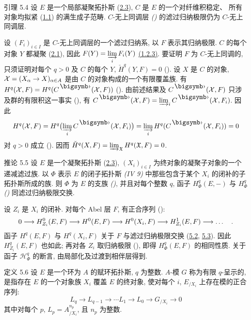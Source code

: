 \begin{enonce*}{引理 5.4}
设\pageoriginale{} $E$ 是一个局部凝聚拓扑斯
(\hyperref[VI.def2.3]{2.3}),
$C$ 是 $E$ 的一个对纤维积稳定、
所有对象均拟紧 (\hyperref[VI.def1.1]{1.1}) 的满生成子范畴.
$C$-无上同调层 \emph{()}
的滤过归纳极限仍为 $C$-无上同调层.
\end{enonce*}

设 $(F_i)_{i\in I}$ 是 $C$-无上同调层的一个滤过归纳系,
以 $F$ 表示其归纳极限.
$C$ 的每个对象 $Y$ 都凝聚 (\hyperref[VI.prop2.1]{2.1}),
因此 $F(Y)=\displaystyle\mathop{\varinjlim}_iF_i(Y)$
\hyperref[VI.thm1.23]{(1.2.3)}.
要证明 $F$ 为 $C$-无上同调的,
只须证明对每个 $q>0$ 及 $C$ 的每个 $Y$,
$\check H^q(Y,F)=0$
().
设 $X$ 是 $C$ 的对象,
$\Xx=(X_{\alpha}\to X)_{\alpha\in A}$
是由 $C$ 的对象构成的一个有限覆盖族.
有 $H^q(\Xx,F)=H^q(C^{\bigdot}(\Xx,F))$
().
由前述结果及 $C^{\bigdot}(\Xx,F)$ 只涉及群的有限积这一事实
(), 有
$C^{\bigdot}(\Xx,F)=\varinjlim_iC^{\bigdot}(\Xx,F_i)$.
因此
$$
H^q(\Xx,F)
=H^q\bigl(\varinjlim_iC^{\bigdot}(\Xx,F_i)\bigr)
=\varinjlim_iH^q(C^{\bigdot}(\Xx,F_i))=0
$$
对 $q>0$ 成立 ().
因而 $\check H^q(X,F)=\varinjlim_{\mathfrak X}H^q(\mathfrak X,F)=0$.

\begin{enonce*}{推论 5.5}
设 $E$ 是一个凝聚拓扑斯
(\hyperref[VI.def2.3]{2.3}),
${(X_i)_{i\in I}}$ 为终对象的凝聚子对象的一个递减滤过族.
以 $\Phi$ 表示 $E$ 的闭子拓扑斯
\emph{(IV 9)} 中那些包含于某个 $X_i$ 的闭补的子拓扑斯所成的族.
则 $\Phi$ 为 $E$ 的支族
\emph{()},
并且对每个整数 $q$,
函子 $H^q_{\Phi}(E,-)$ 与 $H^q_{\Phi}$
\emph{()}
同滤过归纳极限交换.
\end{enonce*}

设 $Z_i$ 是 $X_i$ 的闭补.
对每个 Abel 层 $F$, 有正合序列
():
$$
0 \to H^{0}_{Z_i} (E, F) \to H^{0} (E, F) \to H^{0} (X_i, F) \to
H^{1}_{Z_i} (E, F) \to \ldots\quad {\quoi}.
$$
函子 $H^q(E,F)$ 与 $H^q(X_i,F)$
关于 $F$ 与滤过归纳极限交换
(\hyperref[VI.cor5.2]{5.2}, \hyperref[VI.cor5.3]{5.3}).
因此 $H^q_{Z_i}(E,F)$ 也如此;
再对各 $Z_i$ 取归纳极限
(),
即得 $H^q_{\Phi}(E,F)$ 的相同性质.
关于函子 $\mathcal H^q_{\Phi}$ 的断言,
由局部化及过渡到相伴层得到.

\begin{enonce*}[remark]{定义 5.6}
设\pageoriginale{} $E$ 是一个环为 $A$ 的赋环拓扑斯,
$q$ 为整数.
$A$-模 $G$ 称为有限 $q$-呈示的,
是指存在 $E$ 的一个对象族 $X_i$ 覆盖 $E$ 的终对象,
使对每个 $i$, $E_{/X_i}$ 上存在模的正合序列:
\begin{equation*}
L_q \to L_{q-1} \to \cdots L_1 \to L_0 \to G_{/X_i} \to 0\tag{5.5.1}
\end{equation*}
其中对每个 $p$, $L_p=A^{n_p}_{/X_i}$,
且 $n_p$ 为整数.
\end{enonce*}

